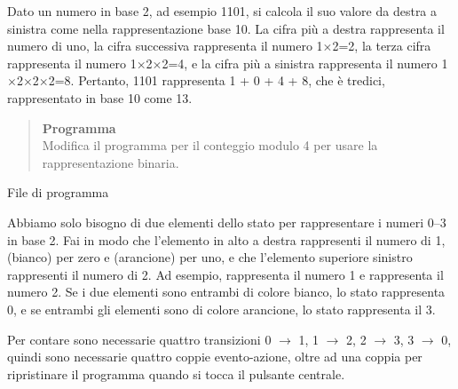 Dato un numero in base 2, ad esempio 1101, si calcola il suo valore da destra
a sinistra come nella rappresentazione base 10.
La cifra più a destra rappresenta il numero di uno, la cifra successiva
rappresenta il numero 1$\times$2=2, la terza cifra rappresenta
il numero 1$\times$2$\times$2=4, e la cifra più a sinistra
rappresenta il
numero 1$\times$2$\times$2$\times$2=8.
Pertanto, 1101 rappresenta 1 + 0 + 4 + 8, che è tredici,
rappresentato in base 10 come 13.

\newpage

\begin{quote}
\textbf{Programma}\\
Modifica il programma per il conteggio modulo 4 per usare la rappresentazione binaria.
\end{quote}

{\raggedleft \hfill File di programma }

Abbiamo solo bisogno di due elementi dello stato per rappresentare i numeri
0--3 in base 2.
Fai in modo che l'elemento in alto a destra rappresenti il numero di 1,
 (bianco) per zero e  (arancione) per uno,
e che l'elemento superiore sinistro rappresenti il numero di 2.
Ad esempio,  rappresenta il numero 1 e
 rappresenta il numero 2.
Se i due elementi sono entrambi di colore bianco, lo stato rappresenta 0, e se entrambi
gli elementi sono di colore arancione, lo stato rappresenta il 3.

Per contare sono necessarie quattro transizioni 0 $\rightarrow$ 1, 1 $\rightarrow$ 2, 2
$\rightarrow$ 3, 3 $\rightarrow$ 0, quindi sono necessarie quattro coppie evento-azione, oltre ad una coppia per ripristinare il programma
quando si tocca il pulsante centrale.

\medskip


\medskip




